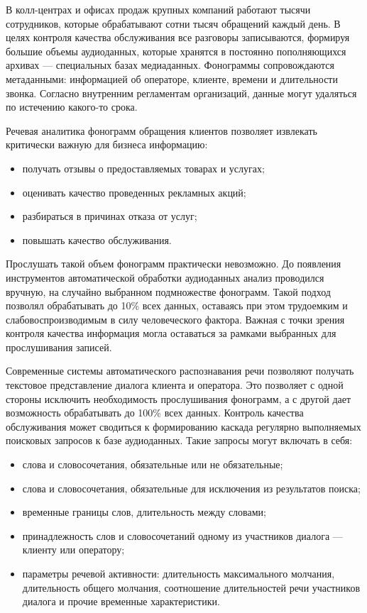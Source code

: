 {\actuality}
В колл-центрах и офисах продаж крупных компаний работают тысячи сотрудников, которые обрабатывают сотни тысяч обращений каждый день. В целях контроля качества обслуживания все разговоры записываются, формируя большие объемы аудиоданных, которые хранятся в постоянно пополняющихся архивах --- специальных базах медиаданных. Фонограммы сопровождаются метаданными: информацией об операторе, клиенте, времени и длительности звонка. Согласно внутренним регламентам организаций, данные могут удаляться по истечению какого-то срока.

Речевая аналитика фонограмм обращения клиентов позволяет извлекать критически важную для бизнеса информацию:
\begin{itemize}[beginpenalty=10000] %
  \item получать отзывы о предоставляемых товарах и услугах;
  \item оценивать качество проведенных рекламных акций;
  \item разбираться в причинах отказа от услуг;
  \item повышать качество обслуживания.
\end{itemize}

Прослушать такой объем фонограмм практически невозможно. До появления инструментов автоматической обработки аудиоданных анализ проводился вручную, на случайно выбранном подмножестве фонограмм. Такой подход позволял обрабатывать до 10\% всех данных, оставаясь при этом трудоемким и слабовоспроизводимым в силу человеческого фактора. Важная с точки зрения контроля качества информация могла оставаться за рамками выбранных для прослушивания записей.

Современные системы автоматического распознавания речи позволяют получать текстовое представление диалога клиента и оператора. Это позволяет с одной стороны исключить необходимость прослушивания фонограмм, а с другой дает возможность обрабатывать до 100\% всех данных. Контроль качества обслуживания может сводиться к формированию каскада регулярно выполняемых поисковых запросов к базе аудиоданных. Такие запросы могут включать в себя:
\begin{itemize}[beginpenalty=10000] %
  \item слова и словосочетания, обязательные или не обязательные;
  \item слова и словосочетания, обязательные для исключения из результатов поиска;
  \item временные границы слов, длительность между словами;
  \item принадлежность слов и словосочетаний одному из участников диалога --- клиенту или оператору;
  \item параметры речевой активности: длительность максимального молчания, длительность общего молчания,
 соотношение длительностей речи участников диалога и прочие временные характеристики.
\end{itemize}

